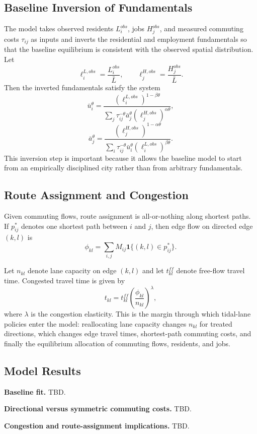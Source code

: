 \documentclass[12pt]{article}
\begin{document}
\subsection{Baseline Inversion of Fundamentals}
The model takes observed residents $L_i^{obs}$, jobs $H_j^{obs}$, and measured commuting costs $\tau_{ij}$ as inputs and inverts the residential and employment fundamentals so that the baseline equilibrium is consistent with the observed spatial distribution. Let
\[
\ell_i^{L,obs} = \frac{L_i^{obs}}{\bar L},
\qquad
\ell_j^{H,obs} = \frac{H_j^{obs}}{\bar L}.
\]
Then the inverted fundamentals satisfy the system
\[
\bar u_i^\theta
=
\frac{(\ell_i^{L,obs})^{1-\beta\theta}}
{\sum_j \tau_{ij}^{-\theta}\bar a_j^\theta(\ell_j^{H,obs})^{\alpha\theta}},
\]
\[
\bar a_j^\theta
=
\frac{(\ell_j^{H,obs})^{1-\alpha\theta}}
{\sum_i \tau_{ij}^{-\theta}\bar u_i^\theta(\ell_i^{L,obs})^{\beta\theta}}.
\]
This inversion step is important because it allows the baseline model to start from an empirically disciplined city rather than from arbitrary fundamentals.

\subsection{Route Assignment and Congestion}
Given commuting flows, route assignment is all-or-nothing along shortest paths. If $p_{ij}^*$ denotes one shortest path between $i$ and $j$, then edge flow on directed edge $(k,l)$ is
\[
\phi_{kl} = \sum_{i,j} M_{ij}\mathbf{1}\{(k,l)\in p_{ij}^*\}.
\]

Let $n_{kl}$ denote lane capacity on edge $(k,l)$ and let $t_{kl}^{ff}$ denote free-flow travel time. Congested travel time is given by
\[
t_{kl} = t_{kl}^{ff} \left(\frac{\phi_{kl}}{n_{kl}}\right)^\lambda,
\]
where $\lambda$ is the congestion elasticity. This is the margin through which tidal-lane policies enter the model: reallocating lane capacity changes $n_{kl}$ for treated directions, which changes edge travel times, shortest-path commuting costs, and finally the equilibrium allocation of commuting flows, residents, and jobs.

\subsection{Model Results}
\textbf{Baseline fit.} TBD.

\textbf{Directional versus symmetric commuting costs.} TBD.

\textbf{Congestion and route-assignment implications.} TBD.
\end{document}
